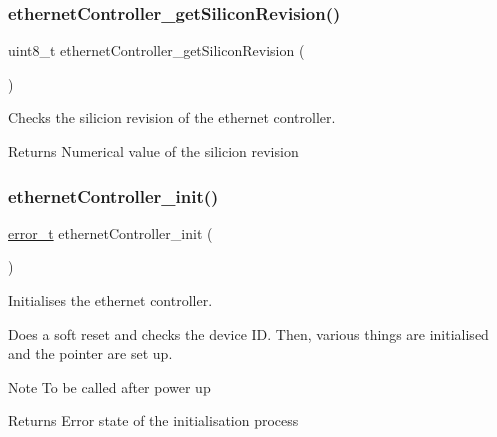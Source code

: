 \subsubsection{\texorpdfstring{ethernetController\_getSiliconRevision()}{ethernetController\_getSiliconRevision()}}
{\footnotesize\ttfamily uint8\+\_\+t ethernet\+Controller\+\_\+get\+Silicon\+Revision (\begin{DoxyParamCaption}{ }\end{DoxyParamCaption})}



Checks the silicion revision of the ethernet controller. 

\begin{DoxyReturn}{Returns}
Numerical value of the silicion revision 
\end{DoxyReturn}
\mbox{\label{group__init_ga440a9f27fc612a678d3d17eb5983c977}} 
\subsubsection{\texorpdfstring{ethernetController\_init()}{ethernetController\_init()}}
{\footnotesize\ttfamily \mbox{\hyperlink{group__error_gad3ae44be85fe6952dcaed425499e8f6b}{error\+\_\+t}} ethernet\+Controller\+\_\+init (\begin{DoxyParamCaption}{ }\end{DoxyParamCaption})}



Initialises the ethernet controller. 

Does a soft reset and checks the device ID. Then, various things are initialised and the pointer are set up. \begin{DoxyNote}{Note}
To be called after power up 
\end{DoxyNote}
\begin{DoxyReturn}{Returns}
Error state of the initialisation process 
\end{DoxyReturn}
\mbox{\label{group__init_ga5cdd5a8c6a5ceab1292643f291137bd1}} 

